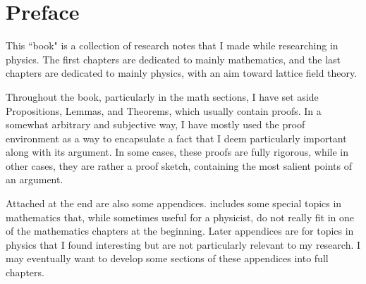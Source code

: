 \documentclass[12pt]{book}
\theoremstyle{definition}
\begin{document}
\chapter{Preface}
This ``book" is a collection of research notes that I made while researching in
physics. The first chapters are dedicated to mainly mathematics, and the last
chapters are dedicated to mainly physics, with an aim toward lattice field
theory. 

Throughout the book, particularly in the math sections, I have set aside
Propositions, Lemmas, and Theorems, which usually contain proofs. 
In a somewhat arbitrary and
subjective way, I have mostly used the proof environment as a way to encapsulate
a fact that I deem particularly important along with its argument.
In some cases, these proofs are fully rigorous, while in other cases, they are 
rather a proof sketch,
containing the most salient points of an argument. 

Attached at the end are also some appendices. 
 includes some special topics in mathematics 
that, while sometimes useful for a physicist, do not really fit in one of 
the mathematics chapters at the beginning.
Later appendices are for topics in physics that I found interesting but are
not particularly relevant to my research.
I may eventually want
to develop some sections of these appendices into full chapters.


\tableofcontents                        %
\mainmatter                             %




%












\begin{appendices}




%

\end{appendices}


\printindex
\end{document}

